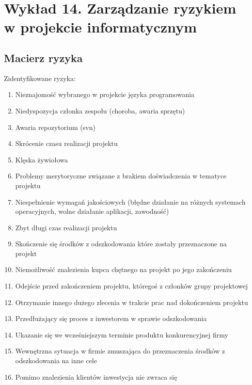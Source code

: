 \chapter{Wykład 14. Zarządzanie ryzykiem w projekcie informatycznym}

\section{Macierz ryzyka}

Zidentyfikowane ryzyka:
\begin{enumerate} %
\item Nieznajomość wybranego w projekcie języka programowania
\item Niedyspozycja członka zespołu (choroba, awaria sprzętu)
\item Awaria repozytorium (svn)
\item Skrócenie czasu realizacji projektu
\item Klęska żywiołowa
\item Problemy merytoryczne związane z brakiem doświadczenia w tematyce projektu
\item Niespełnienie wymagań jakościowych (błędne działanie na różnych systemach operacyjnych, wolne działanie aplikacji, zawodność)
\item Zbyt długi czas realizacji projektu
\item Skończenie się środków z odszkodowania które zostały przeznaczone na projekt
\item Niemożliwość znalezienia kupca chętnego na projekt po jego zakończeniu
\item Odejście przed zakończeniem projektu, któregoś z członków grupy projektowej
\item Otrzymanie innego dużego zlecenia w trakcie prac nad dokończeniem projektu
\item Przedłużający się proces z inwestorem w sprawie odszkodowania
\item Ukazanie się we wcześniejszym terminie produktu konkurencyjnej firmy
\item Wewnętrzna sytuacja w firmie zmuszająca do przeznaczenia środków z odszkodowania na inne cele
\item Pomimo znalezienia klientów inwestycja nie zwraca się
\end{enumerate}


